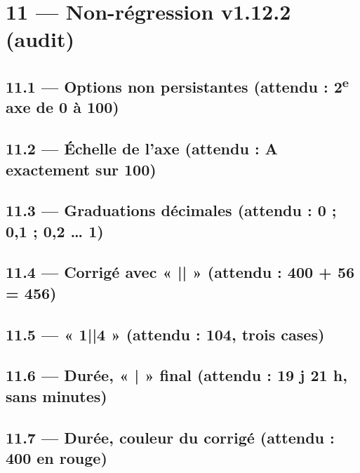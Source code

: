\documentclass[12pt]{extarticle}
\begin{document}
\section*{11 — Non-régression v1.12.2 (audit)}

\subsection*{11.1 — Options non persistantes (attendu : 2\textsuperscript{e} axe de 0 à 100)}

\axegradue[fin=400, pas=100]

\axegradue

\subsection*{11.2 — Échelle de l'axe (attendu : A exactement sur 100)}

\axegradue[debut=0, fin=105, pas=10, points={A/100}]

\subsection*{11.3 — Graduations décimales (attendu : 0 ; 0,1 ; 0,2 … 1)}

\axegradue[debut=0, fin=1, pas=0.1]

\subsection*{11.4 — Corrigé avec « || » (attendu : 400 + 56 = 456)}


\subsection*{11.5 — « 1||4 » (attendu : 104, trois cases)}


\subsection*{11.6 — Durée, « | » final (attendu : 19 j 21 h, sans minutes)}


\subsection*{11.7 — Durée, couleur du corrigé (attendu : 400 en rouge)}
\end{document}

